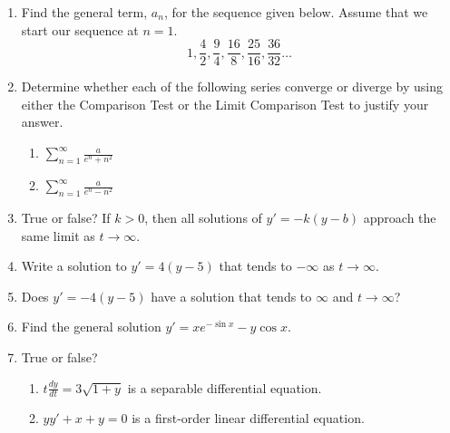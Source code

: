 \documentclass{nosvagor-notes}
\begin{document}
\begin{enumerate}
  \newpage

  \item Find the general term, \(a_n\), for the sequence given below. Assume that
  we start our sequence at \(n=1\).
  \[%
    1,\frac{4}{2}, \frac{9}{4}, \frac{16}{8}, \frac{25}{16}, \frac{36}{32}\ldots
  \]%
  \vspace{180pt}

  \item Determine whether each of the following series converge or diverge by
    using either the Comparison Test or the Limit Comparison Test to justify
    your answer.
    \begin{enumerate}
      \item \(\displaystyle\sum_{n=1}^{\infty} \frac{a}{e^n + n^2}\)
      \vspace{180pt}
      \item \(\displaystyle\sum_{n=1}^{\infty} \frac{a}{e^n - n^2}\)
    \end{enumerate}

  \newpage

  \item True or false? If \(k > 0\), then all solutions of \(y' = -k(y-b)\)
  approach the same limit as \(t \to \infty\).
  \vspace{60pt}

  \item Write a solution to \(y' = 4(y-5)\) that tends to \(-\infty\) as \(t\to
  \infty\).
  \vspace{90pt}

  \item Does \(y'=-4(y-5)\) have a solution that tends to \(\infty\) and \(t \to
  \infty\)?
  \vspace{90pt}

  \item Find the general solution \(y' = xe^{-\sin x} - y \cos x\).


  \newpage

  \item True or false?
  \begin{enumerate}
    \item \(t \frac{dy}{dt} = 3\sqrt{1+y} \) is a separable differential
      equation.
    \vspace{80pt}
    \item \(yy' + x + y = 0\) is a first-order linear differential equation.
    \vspace{80pt}
  \end{enumerate}


\end{enumerate}
\end{document}
